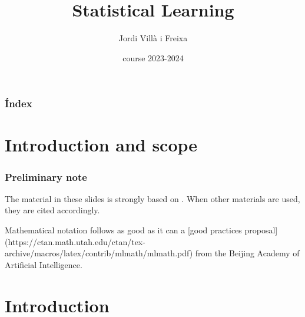 \documentclass{beamer}
\title[Sttatistical Learning]{Statistical Learning} %
\author{Jordi Villà i Freixa} %
\institute[FCTE] %
{
Universitat de Vic - Universitat Central de Catalunya \\
Study Abroad\\ %
\medskip
\textit{jordi.villa@uvic.cat} %
}
\date{course 2023-2024}
\begin{document}
\begin{frame}
\titlepage %
\end{frame}

\begin{frame}
\frametitle{Índex} %
\tableofcontents %
\end{frame}

\section{Introduction and scope}
\begin{frame}
  \frametitle{Preliminary note}
  The material in these slides is strongly based on \cite{kroese2020}. When other materials are used, they are cited accordingly.

  Mathematical notation follows as good as it can a [good practices proposal](https://ctan.math.utah.edu/ctan/tex-archive/macros/latex/contrib/mlmath/mlmath.pdf) from the Beijing Academy of Artificial Intelligence.
  \end{frame}

\section{Introduction} %

\end{document}
